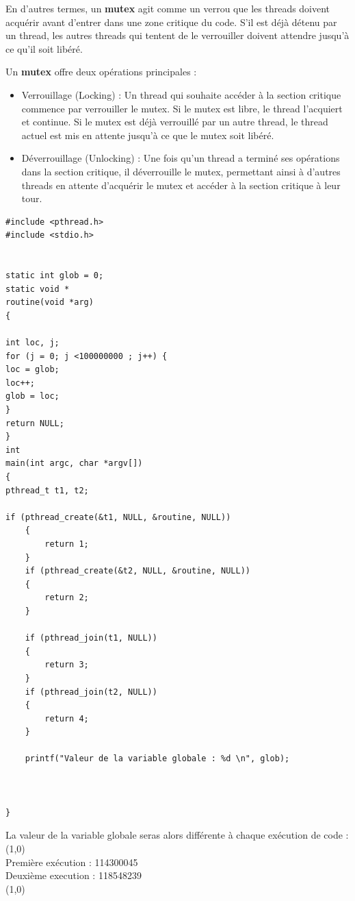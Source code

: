 En d'autres termes, un \textbf{mutex} agit comme un verrou que les threads doivent acquérir avant d'entrer dans une zone critique du code. S'il est déjà détenu par un thread, les autres threads qui tentent de le verrouiller doivent attendre jusqu'à ce qu'il soit libéré.

Un \textbf{mutex} offre deux opérations principales :
\\
\begin{itemize}
    \item Verrouillage (Locking) : Un thread qui souhaite accéder à la section critique commence par verrouiller le mutex. Si le mutex est libre, le thread l'acquiert et continue. Si le mutex est déjà verrouillé par un autre thread, le thread actuel est mis en attente jusqu'à ce que le mutex soit libéré.
\\
    \item Déverrouillage (Unlocking) : Une fois qu'un thread a terminé ses opérations dans la section critique, il déverrouille le mutex, permettant ainsi à d'autres threads en attente d'acquérir le mutex et accéder à la section critique à leur tour.
\end{itemize}
\vspace{\baselineskip}

\begin{lstlisting}[title = Code sans mutex]
#include <pthread.h>
#include <stdio.h>


static int glob = 0;
static void *
routine(void *arg)
{

int loc, j;
for (j = 0; j <100000000 ; j++) {
loc = glob;
loc++;
glob = loc;
}
return NULL;
}
int
main(int argc, char *argv[])
{
pthread_t t1, t2;

if (pthread_create(&t1, NULL, &routine, NULL))
	{
		return 1;
	}
	if (pthread_create(&t2, NULL, &routine, NULL))
	{
		return 2;
	}

	if (pthread_join(t1, NULL))
	{
		return 3;
	}
	if (pthread_join(t2, NULL))
	{
		return 4;
	}

	printf("Valeur de la variable globale : %d \n", glob);



}

\end{lstlisting}
\vspace{\baselineskip}

La valeur de la variable globale seras alors différente à chaque exécution de code : 
\\
\line(1,0){\linewidth}
\\
Première exécution : 114300045\\
Deuxième execution : 118548239
\\
\line(1,0){\linewidth}

